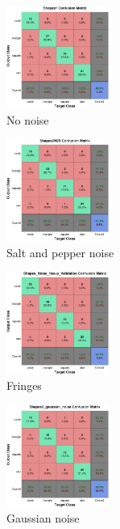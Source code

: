 \documentclass[conference]{IEEEtran}
\begin{document}
\begin{figure}%
\centering
\includegraphics[width=0.3\textwidth]{confusion_matrix_Shapes1}
\caption{No noise}
\end{figure}
\begin{figure}%
\centering
\includegraphics[width=0.3\textwidth]{confusion_matrix_Shapes2N2B}
\caption{Salt and pepper noise}
\end{figure}
\begin{figure}%
\centering
\includegraphics[width=0.3\textwidth]{confusion_matrix_Shapes_Noise_Heavy_Validation}
\caption{Fringes}
\end{figure}
\begin{figure}%
\centering
\includegraphics[width=0.3\textwidth]{confusion_matrix_Shapes0_gaussian_noise}
\caption{Gaussian noise}
\end{figure}


\end{document}
